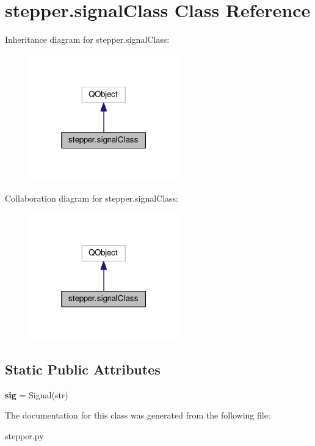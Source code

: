 \hypertarget{classstepper_1_1signal_class}{}\section{stepper.\+signal\+Class Class Reference}
\label{classstepper_1_1signal_class}


Inheritance diagram for stepper.\+signal\+Class\+:
\nopagebreak
\begin{figure}[H]
\begin{center}
\leavevmode
\includegraphics[width=183pt]{classstepper_1_1signal_class__inherit__graph}
\end{center}
\end{figure}


Collaboration diagram for stepper.\+signal\+Class\+:
\nopagebreak
\begin{figure}[H]
\begin{center}
\leavevmode
\includegraphics[width=183pt]{classstepper_1_1signal_class__coll__graph}
\end{center}
\end{figure}
\subsection*{Static Public Attributes}
\begin{DoxyCompactItemize}
\item 
{\bfseries sig} = Signal(str)\hypertarget{classstepper_1_1signal_class_a2bbd932799b1529a75912e5a1a45cf1a}{}\label{classstepper_1_1signal_class_a2bbd932799b1529a75912e5a1a45cf1a}

\end{DoxyCompactItemize}


The documentation for this class was generated from the following file\+:\begin{DoxyCompactItemize}
\item 
stepper.\+py\end{DoxyCompactItemize}
